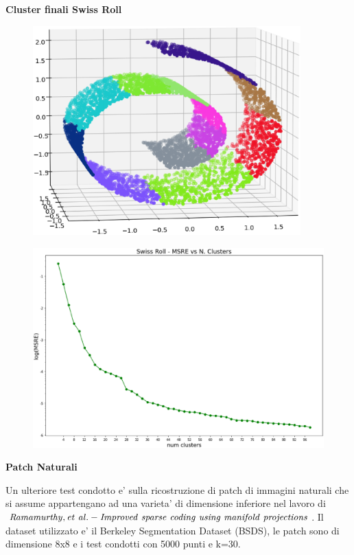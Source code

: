 \documentclass[a4, landscape]{seminar}
\theoremstyle{definition}
\def\bc{\begin{center}}
\def\ec{\end{center}}
\def\bs{\begin{slide}\begingroup\small}
\def\es{\endgroup\end{slide}}
\begin{document}
\bs
\bc{\bf\color{blue}Cluster finali Swiss Roll}\ec
\begin{figure}[b]
\centering
\includegraphics[width=0.92\textwidth]{swissroll.eps}
\end{figure}
\es

\bs
\begin{figure}[b]
\centering
\includegraphics[width=\textwidth]{swiss_msre.eps}
\end{figure}
\es

\bs
\bc{\bf\color{blue}Patch Naturali}\ec
Un ulteriore test condotto e' sulla ricostruzione di patch di immagini naturali che si
assume appartengano ad una varieta' di dimensione inferiore nel lavoro di $\it{Ramamurthy, et\ al. - Improved\ sparse\
coding\ using\ manifold\ projections}$. Il dataset utilizzato e' il Berkeley Segmentation Dataset (BSDS),
le patch sono di dimensione 8x8 e i test condotti con 5000 punti e k=30.
\es
\end{document}
